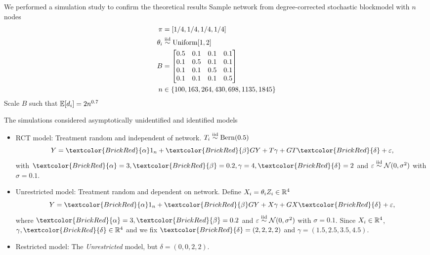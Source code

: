 \documentclass[aspectratio=169]{beamer}
\theoremstyle{remark}
\begin{document}
\begin{frame}{We performed a simulation study to confirm the theoretical results}
    Sample network from degree-corrected stochastic blockmodel with $n$ nodes
    \begin{align*}
        \pi      & = [1/4, 1/4, 1/4, 1/4]                        \\
        \theta_i & \stackrel{\mathrm{iid}}{\sim} \mathrm{Uniform}[1, 2]                  \\
        B        & =
        \begin{bmatrix}
            0.5 & 0.1 & 0.1 & 0.1 \\
            0.1 & 0.5 & 0.1 & 0.1 \\
            0.1 & 0.1 & 0.5 & 0.1 \\
            0.1 & 0.1 & 0.1 & 0.5 \\
        \end{bmatrix}                                 \\
        n        & \in \{100, 163, 264, 430, 698, 1135, 1845\}
    \end{align*}
    Scale $B$ such that $\E{d_i} = 2 n^{0.7}$
\end{frame}

\begin{frame}{The simulations considered asymptotically \textcolor{BrickRed}{unidentified} and identified models}
    \begin{itemize}
        \setlength\itemsep{1.75em}
        \item \textcolor{BrickRed}{RCT model}: Treatment random and independent of network. $T_i \stackrel{\mathrm{iid}}{\sim} \operatorname*{Bern}(0.5)$
              \begin{equation*}
                  Y = \textcolor{BrickRed}{\alpha} 1_n + \textcolor{BrickRed}{\beta} G Y + T \gamma + G T \textcolor{BrickRed}{\delta} + \varepsilon,
              \end{equation*}
              with $\textcolor{BrickRed}{\alpha} = 3, \textcolor{BrickRed}{\beta} = 0.2, \gamma = 4, \textcolor{BrickRed}{\delta} = 2$ and $\varepsilon \stackrel{\mathrm{iid}}{\sim} \mathcal{N}(0, \sigma^2)$ with $\sigma = 0.1$.
        \item \textcolor{BrickRed}{Unrestricted model}: Treatment random and dependent on network. Define $X_i = \theta_i Z_i \in \mathbb{R}^4$
              \begin{equation*}
                  Y = \textcolor{BrickRed}{\alpha} 1_n + \textcolor{BrickRed}{\beta} G Y + X \gamma + G X \textcolor{BrickRed}{\delta} + \varepsilon,
              \end{equation*}
              where $\textcolor{BrickRed}{\alpha} = 3, \textcolor{BrickRed}{\beta} = 0.2$ and $\varepsilon \stackrel{\mathrm{iid}}{\sim} \mathcal{N}(0, \sigma^2)$ with $\sigma = 0.1$. Since $X_i \in \mathbb{R}^4$, $\gamma, \textcolor{BrickRed}{\delta} \in \R^4$ and we fix $\textcolor{BrickRed}{\delta} = (2, 2, 2, 2)$ and $\gamma = (1.5, 2.5, 3.5, 4.5)$.
        \item Restricted model: The \emph{Unrestricted} model, but $\delta = (0, 0, 2, 2)$.
    \end{itemize}
\end{frame}
\end{document}

